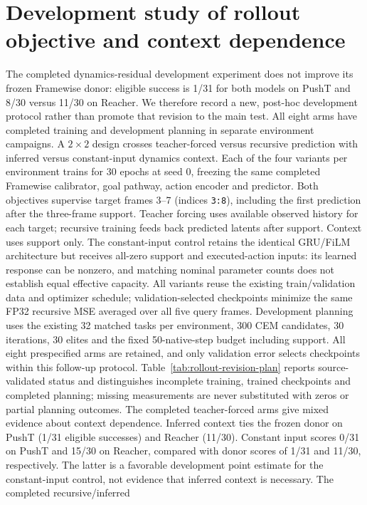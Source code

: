 \FloatBarrier
\section{Development study of rollout objective and context dependence}
\label{sec:rollout-revision}
The completed dynamics-residual development experiment does not improve its
frozen Framewise donor: eligible success is 1/31 for both models on PushT and
8/30 versus 11/30 on Reacher. We therefore record a new, post-hoc development
protocol rather than promote that revision to the main test. All eight arms
have completed training and development planning in separate environment
campaigns. A $2\times2$
design crosses teacher-forced versus recursive prediction with inferred
versus constant-input dynamics context. Each of the four variants per
environment trains for 30 epochs at seed 0, freezing the same completed
Framewise calibrator, goal pathway, action encoder and predictor. Both
objectives supervise target frames 3--7 (indices \texttt{3:8}), including
the first prediction after the three-frame support. Teacher forcing uses
available observed history for each target; recursive training feeds back
predicted latents after support. Context uses support only. The constant-input
control retains the identical GRU/FiLM architecture but receives all-zero
support and executed-action inputs: its learned response can be nonzero,
and matching nominal parameter counts does not establish equal effective
capacity. All variants reuse the existing train/validation data and optimizer
schedule; validation-selected checkpoints minimize the same FP32 recursive
MSE averaged over all five query frames. Development planning uses the
existing 32 matched tasks per environment, 300 CEM candidates, 30 iterations,
30 elites and the fixed 50-native-step budget including support. All eight
prespecified arms are retained, and only validation error selects
checkpoints within this follow-up protocol.
Table~\ref{tab:rollout-revision-plan} reports source-validated status and
distinguishes incomplete training, trained checkpoints and completed planning;
missing measurements are
never substituted with zeros or partial planning outcomes.
The completed teacher-forced arms give mixed evidence about context dependence.
Inferred context ties the frozen donor on PushT (1/31 eligible successes) and
Reacher (11/30). Constant input scores 0/31 on PushT and 15/30 on Reacher,
compared with donor scores of 1/31 and 11/30, respectively. The latter is a
favorable development point estimate for the constant-input control, not
evidence that inferred context is necessary. The completed recursive/inferred
